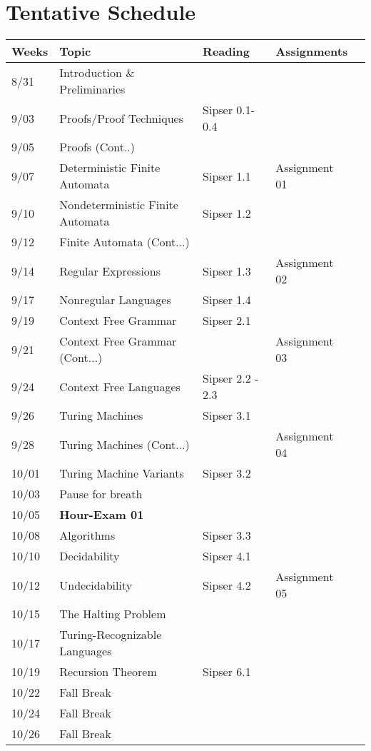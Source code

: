 \documentclass[twoside]{article}
\begin{document}
\section{Tentative Schedule}
\begin{longtable}{lllll}
\toprule
Weeks & Topic & Reading & Assignments\\\toprule
\endhead
8/31 & Introduction \& Preliminaries & &\\\midrule%
9/03 & Proofs/Proof Techniques & Sipser 0.1-0.4 &\\
9/05 & Proofs (Cont..) &  &\\
9/07 & Deterministic Finite Automata & Sipser 1.1 & Assignment 01\\\midrule
9/10 & Nondeterministic Finite Automata & Sipser 1.2 &\\%
9/12 & Finite Automata (Cont...)& \\
9/14 & Regular Expressions& Sipser 1.3 & Assignment 02\\\midrule
9/17 &  Nonregular Languages & Sipser 1.4&\\%
9/19 & Context Free Grammar & Sipser 2.1&  &\\
9/21 & Context Free Grammar (Cont...) & &Assignment 03\\\midrule
9/24 & Context Free Languages & Sipser 2.2 - 2.3& \\%
9/26 & Turing Machines & Sipser 3.1& \\
9/28 & Turing Machines (Cont...)& &Assignment 04\\\midrule
10/01 & Turing Machine Variants & Sipser 3.2 & \\%
10/03 & Pause for breath& &\\
10/05 & {\bf Hour-Exam 01} & &\\\midrule
10/08 & Algorithms & Sipser 3.3 &\\
10/10 & Decidability& Sipser 4.1&\\%
10/12 & Undecidability & Sipser 4.2& Assignment 05\\\midrule
10/15 & The Halting Problem & &\\
10/17 & Turing-Recognizable Languages & &\\
10/19 & Recursion Theorem& Sipser 6.1 & \\\midrule
10/22 & Fall Break & &\\
10/24 & Fall Break & &\\
10/26 & Fall Break & &\\\midrule

\end{longtable}
\end{document}
